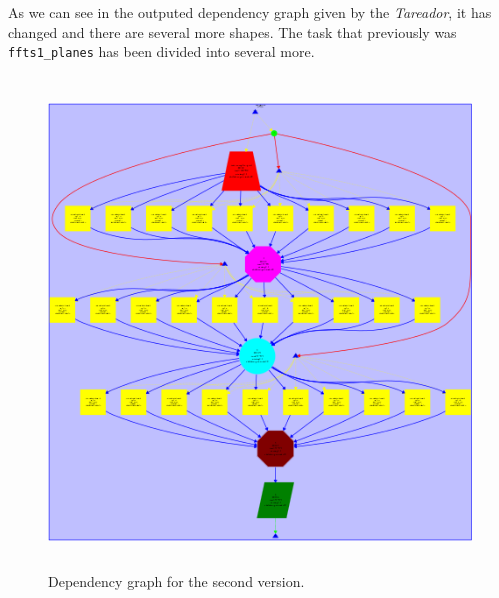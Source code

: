 \documentclass[12]{article}
\begin{document}
As we can see in the outputed dependency graph given by the \textit{Tareador}, it has changed and there are several more shapes. The task that previously was \texttt{ffts1\_planes} has been divided into several more. 
\begin{figure}[H]
\centering  \includegraphics[width=\linewidth , height=13cm, width=13cm ]{images/dependency_graph2.png}
  \caption{Dependency graph for the second version.}
  \label{fig:Depencency2nd}
\end{figure}
\end{document}
